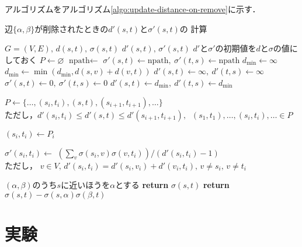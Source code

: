 アルゴリズムをアルゴリズム\ref{algo:update-distance-on-remove}に示す．
\begin{algorithm}
  \caption{辺$\{\alpha,\beta\}$が削除されたときの$d'(s,t)$と$\sigma'(s,t)$の
  計算}\label{algo:update-distance-on-remove}
  \begin{algorithmic}[1]
    \Require $G=(V,E),\,d(s,t),\,\sigma(s,t)$
    \Ensure $d'(s,t),\,\sigma'(s,t)$
    \State $d'$と$\sigma'$の初期値を$d$と$\sigma$の値にしておく
    \State $P\gets\varnothing$
    \State $\textrm{npath}\gets$
    \State $\sigma'(s,t)\gets\textrm{npath},\:\sigma'(t,s)\gets\textrm{npath}$
    \Else{}
    \State $d_{\min}\gets \infty$
    \State $d_{\min}\gets\min\left(d_{\min},d(s,v)+d(v,t)\right)$
    \EndIf
    \EndFor
    \State $d'(s,t)\gets\infty,\:d'(t,s)\gets\infty$
    \State $\sigma'(s,t)\gets 0,\:\sigma'(t,s)\gets 0$
    \Else
    \State $d'(s,t)\gets d_{\min},\:d'(t,s)\gets d_{\min}$
    \State \parbox[t]{\linewidth}{
      $P\gets \{\ldots,(s_i,t_i),(s,t),(s_{i+1},t_{i+1}),\ldots\}$\\
      ただし，$d'(s_i,t_i)\leq d'(s,t)\leq d'(s_{i+1},t_{i+1}),\:$
      $(s_1,t_1),\ldots,(s_i,t_i),\ldots\in P$
    }
    \EndIf
    \EndIf
    \EndFor
    \State $(s_i,t_i)\gets P_i$
    \State \parbox[t]{\linewidth}{
      $\sigma'(s_i,t_i)\gets$
      $\left(\sum_{v}\sigma(s_i,v)\sigma(v,t_i)\right) / (d'(s_i,t_i)-1)$ \\
      ただし，
      $v\in V,\,d'(s_i,t_i)=d'(s_i,v_i)+d'(v_i,t_i),\,v\neq s_i,\,v\neq t_i$
    }
    \EndFor
    \State $(\alpha,\beta)$のうち$s$に近いほうを$\alpha$とする
    \State \textbf{return} $\sigma(s,t)$
    \Else
    \State \textbf{return} $\sigma(s,t)-\sigma(s,\alpha)\sigma(\beta,t)$
    \EndIf
    \EndProcedure
  \end{algorithmic}
\end{algorithm}

\section{実験}

